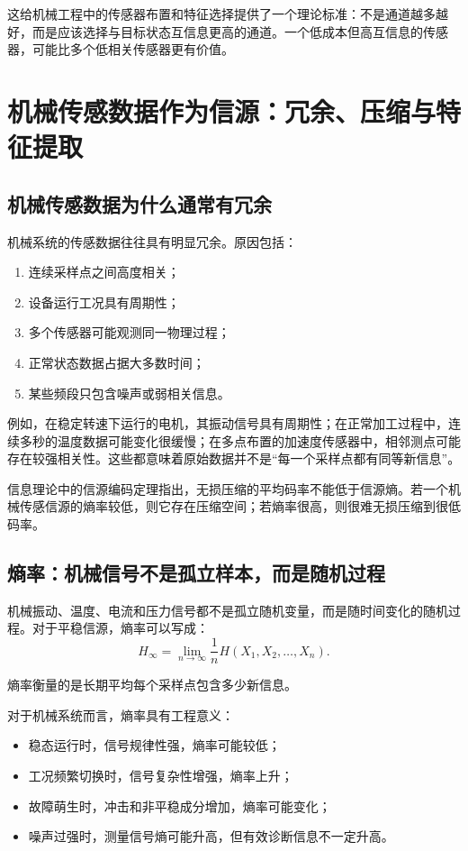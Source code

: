 \documentclass[UTF8,a4paper,12pt]{ctexart}
\begin{document}
这给机械工程中的传感器布置和特征选择提供了一个理论标准：不是通道越多越好，而是应该选择与目标状态互信息更高的通道。一个低成本但高互信息的传感器，可能比多个低相关传感器更有价值。

\section{机械传感数据作为信源：冗余、压缩与特征提取}

\subsection{机械传感数据为什么通常有冗余}

机械系统的传感数据往往具有明显冗余。原因包括：
\begin{enumerate}
  \item 连续采样点之间高度相关；
  \item 设备运行工况具有周期性；
  \item 多个传感器可能观测同一物理过程；
  \item 正常状态数据占据大多数时间；
  \item 某些频段只包含噪声或弱相关信息。
\end{enumerate}

例如，在稳定转速下运行的电机，其振动信号具有周期性；在正常加工过程中，连续多秒的温度数据可能变化很缓慢；在多点布置的加速度传感器中，相邻测点可能存在较强相关性。这些都意味着原始数据并不是“每一个采样点都有同等新信息”。

信息理论中的信源编码定理指出，无损压缩的平均码率不能低于信源熵。若一个机械传感信源的熵率较低，则它存在压缩空间；若熵率很高，则很难无损压缩到很低码率。

\subsection{熵率：机械信号不是孤立样本，而是随机过程}

机械振动、温度、电流和压力信号都不是孤立随机变量，而是随时间变化的随机过程。对于平稳信源，熵率可以写成：
\begin{equation}
H_\infty=\lim_{n\to\infty}\frac{1}{n}H(X_1,X_2,\dots,X_n).
\end{equation}

熵率衡量的是长期平均每个采样点包含多少新信息。

对于机械系统而言，熵率具有工程意义：
\begin{itemize}
  \item 稳态运行时，信号规律性强，熵率可能较低；
  \item 工况频繁切换时，信号复杂性增强，熵率上升；
  \item 故障萌生时，冲击和非平稳成分增加，熵率可能变化；
  \item 噪声过强时，测量信号熵可能升高，但有效诊断信息不一定升高。
\end{itemize}
\end{document}
